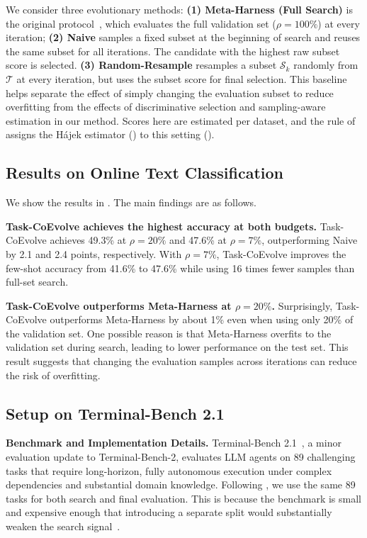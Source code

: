\documentclass{article} %
\begin{document}
We consider three evolutionary methods:
\textbf{(1) Meta-Harness (Full Search)} is the original protocol~\citep{lee2026meta}, which evaluates the full validation set ($\rho=100\%$) at every iteration;
\textbf{(2) Naive} samples a fixed subset at the beginning of search and reuses the same subset for all iterations. The candidate with the highest raw subset score is selected.
\textbf{(3) Random-Resample} resamples a subset $\mathcal{S}_k$ randomly from $\mathcal{T}$ at every iteration, but uses the subset score for final selection. This baseline helps separate the effect of simply changing the evaluation subset to reduce overfitting from the effects of discriminative selection and sampling-aware estimation in our method. Scores here are estimated per dataset, and the rule of  assigns the H\'ajek estimator () to this setting ().


\subsection{Results on Online Text Classification}
\label{subsec:result_text-classification}
We show the results in . The main findings are as follows.


\textbf{Task-CoEvolve achieves the highest accuracy at both budgets.}
Task-CoEvolve achieves 49.3\% at $\rho{=}20\%$ and 47.6\% at $\rho{=}7\%$, outperforming Naive by 2.1 and 2.4 points, respectively.
With $\rho{=}7\%$, Task-CoEvolve improves the few-shot accuracy from 41.6\% to 47.6\% while using 16 times fewer samples than full-set search.

\textbf{Task-CoEvolve outperforms Meta-Harness at $\rho=20\%$.}
Surprisingly, Task-CoEvolve outperforms Meta-Harness by about 1\% even when using only 20\% of the validation set. One possible reason is that Meta-Harness overfits to the validation set during search, leading to lower performance on the test set. This result suggests that changing the evaluation samples across iterations can reduce the risk of overfitting.

\subsection{Setup on Terminal-Bench 2.1}
\label{subsec:setup_terminal}
\textbf{Benchmark and Implementation Details.}
Terminal-Bench 2.1~\citep{merrill2026terminal}, a minor evaluation update to Terminal-Bench-2, evaluates LLM agents on 89 challenging tasks that require long-horizon, fully autonomous execution under complex dependencies and substantial domain knowledge. Following \citet{lee2026meta}, we use the same 89 tasks for both search and final evaluation. This is because the benchmark is small and expensive enough that introducing a separate split would substantially weaken the search signal~\citep{lee2026meta}.
\end{document}
